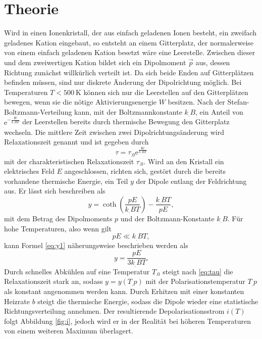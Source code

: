\section{Theorie}
\label{sec:Theorie}

Wird in einen Ionenkristall, der aus einfach geladenen Ionen besteht, ein zweifach geladenes Kation eingebaut, so entsteht an einem Gitterplatz, der normalerweise von einem einfach geladenen Kation besetzt wäre eine Leerstelle.
Zwischen dieser und dem zweiwertigen Kation bildet sich ein Dipolmoment $\vec{p}$ aus, dessen Richtung zunächst willkürlich verteilt ist. Da sich beide Enden auf Gitterplätzen befinden müssen, sind nur diskrete Änderung der Dipolrichtung möglich. Bei Temperaturen $T<\SI{500}{\kelvin}$ können sich nur die Leerstellen auf den Gitterplätzen bewegen, wenn sie die nötige Aktivierungsenergie $W$ besitzen. Nach der Stefan-Boltzmann-Verteilung kann, mit der Boltzmannkonstante $k_.B$, ein Anteil von $\mathrm{e}^{-\frac{W}{k_.BT}}$ der Leerstellen bereits durch thermische Bewegung den Gitterplatz wechseln.
Die mittlere Zeit zwischen zwei Dipolrichtungsänderung wird Relaxationszeit genannt und ist gegeben durch
\begin{equation}
\tau=\tau_.0\mathrm{e}^{\frac{W}{k_.BT}}\label{eq:tau}
\end{equation}
mit der charakteristischen Relaxationszeit $\tau_.0$.
Wird an den Kristall ein elektrisches Feld $E$ angeschlossen, richten sich, gestört durch die bereits vorhandene thermische Energie, ein Teil $y$ der Dipole entlang der Feldrichtung aus. Er lässt sich beschreiben als
\begin{equation}
y=\coth(\frac{p E}{k_.B T})-\frac{k_.BT}{pE}\label{eq:y1},
\end{equation}
mit dem Betrag des Dipolmoments $p$ und der Boltzmann-Konstante $k_.B$. 
Für hohe Temperaturen, also wenn gilt
\[
pE\ll k_.BT,
\]
kann Formel \eqref{eq:y1} näherungsweise beschrieben werden als
\begin{equation}
y=\frac{pE}{3k_.BT}\text{.}\label{eq:y}
\end{equation}
Durch schnelles Abkühlen auf eine Temperatur $T_.0$ steigt nach \eqref{eq:tau} die Relaxationszeit stark an, sodass $y=y(T_.p)$ mit der Polarisationstemperatur $T_.p$ als konstant angenommen werden kann.
Durch Erhitzen mit einer konstanten Heizrate $b$ steigt die thermische Energie, sodass die Dipole wieder eine statistische Richtungsverteilung annehmen. Der resultierende Depolarisationsstrom $i(T)$ folgt Abbildung \ref{fig:i}, jedoch wird er in der Realität bei höheren Temperaturen von einem weiteren Maximum überlagert.
